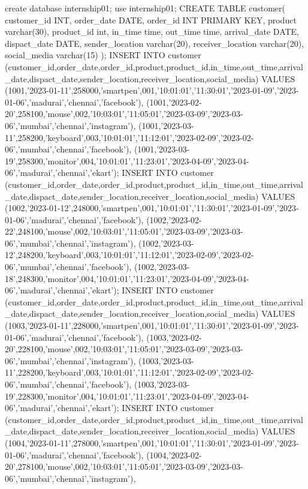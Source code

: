 create database internship01;
use internship01; 
CREATE TABLE customer(
 customer_id INT,
 order_date DATE,
 order_id INT PRIMARY KEY,
 product varchar(30),
 product_id int,
 in_time time,
 out_time time,
 arrival_date DATE,
 dispact_date DATE,
 sender_location varchar(20),
 receiver_location varchar(20),
 social_media varchar(15)
);
INSERT INTO customer
(customer_id,order_date,order_id,product,product_id,in_time,out_time,arrival_date,dispact_date,sender_location,receiver_location,social_media) VALUES
(1001,'2023-01-11',258000,'smartpen',001,'10:01:01','11:30:01','2023-01-09','2023-01-06','madurai','chennai','facebook'),
(1001,'2023-02-20',258100,'mouse',002,'10:03:01','11:05:01','2023-03-09','2023-03-06','mumbai','chennai','instagram'),
(1001,'2023-03-11',258200,'keyboard',003,'10:01:01','11:12:01','2023-02-09','2023-02-06','mumbai','chennai','facebook'),
(1001,'2023-03-19',258300,'monitor',004,'10:01:01','11:23:01','2023-04-09','2023-04-06','madurai','chennai','ekart');
INSERT INTO customer
(customer_id,order_date,order_id,product,product_id,in_time,out_time,arrival_date,dispact_date,sender_location,receiver_location,social_media) VALUES
(1002,'2023-01-12',248000,'smartpen',001,'10:01:01','11:30:01','2023-01-09','2023-01-06','madurai','chennai','facebook'),
(1002,'2023-02-22',248100,'mouse',002,'10:03:01','11:05:01','2023-03-09','2023-03-06','mumbai','chennai','instagram'),
(1002,'2023-03-12',248200,'keyboard',003,'10:01:01','11:12:01','2023-02-09','2023-02-06','mumbai','chennai','facebook'),
(1002,'2023-03-18',248300,'monitor',004,'10:01:01','11:23:01','2023-04-09','2023-04-06','madurai','chennai','ekart');
INSERT INTO customer
(customer_id,order_date,order_id,product,product_id,in_time,out_time,arrival_date,dispact_date,sender_location,receiver_location,social_media) VALUES
(1003,'2023-01-11',228000,'smartpen',001,'10:01:01','11:30:01','2023-01-09','2023-01-06','madurai','chennai','facebook'),
(1003,'2023-02-20',228100,'mouse',002,'10:03:01','11:05:01','2023-03-09','2023-03-06','mumbai','chennai','instagram'),
(1003,'2023-03-11',228200,'keyboard',003,'10:01:01','11:12:01','2023-02-09','2023-02-06','mumbai','chennai','facebook'),
(1003,'2023-03-19',228300,'monitor',004,'10:01:01','11:23:01','2023-04-09','2023-04-06','madurai','chennai','ekart');
INSERT INTO customer
(customer_id,order_date,order_id,product,product_id,in_time,out_time,arrival_date,dispact_date,sender_location,receiver_location,social_media) VALUES
(1004,'2023-01-11',278000,'smartpen',001,'10:01:01','11:30:01','2023-01-09','2023-01-06','madurai','chennai','facebook'),
(1004,'2023-02-20',278100,'mouse',002,'10:03:01','11:05:01','2023-03-09','2023-03-06','mumbai','chennai','instagram'),
